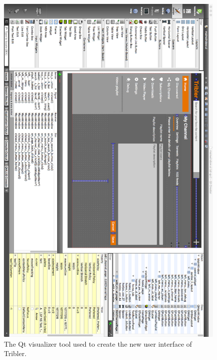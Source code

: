 \begin{figure}[t]
	\centering
	\includegraphics[width=1.0\columnwidth]{images/improving_qa/qt_designer}
	\caption{The Qt visualizer tool used to create the new user interface of Tribler.}
	\label{fig:qt-visualizer}
\end{figure}